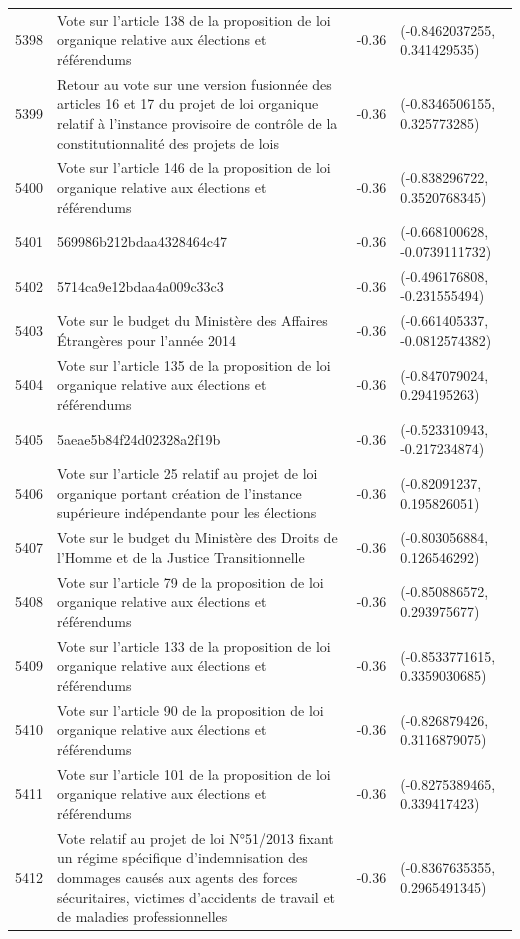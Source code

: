 \begin{table}[ht]
\begin{tabular}{rlrl}
  5398 & Vote sur l'article 138 de la proposition de loi organique relative aux élections et référendums & -0.36 & (-0.8462037255, 0.341429535) \\ 
  5399 & Retour au vote sur une version fusionnée des articles 16 et 17 du projet de loi organique relatif à l'instance provisoire de contrôle de la constitutionnalité des projets de lois & -0.36 & (-0.8346506155, 0.325773285) \\ 
  5400 & Vote sur l'article 146 de la proposition de loi organique relative aux élections et référendums & -0.36 & (-0.838296722, 0.3520768345) \\ 
  5401 & 569986b212bdaa4328464c47 & -0.36 & (-0.668100628, -0.0739111732) \\ 
  5402 & 5714ca9e12bdaa4a009c33c3 & -0.36 & (-0.496176808, -0.231555494) \\ 
  5403 & Vote sur le budget du Ministère des Affaires Étrangères pour l'année 2014 & -0.36 & (-0.661405337, -0.0812574382) \\ 
  5404 & Vote sur l'article 135 de la proposition de loi organique relative aux élections et référendums & -0.36 & (-0.847079024, 0.294195263) \\ 
  5405 & 5aeae5b84f24d02328a2f19b & -0.36 & (-0.523310943, -0.217234874) \\ 
  5406 & Vote sur l'article 25 relatif au projet de loi organique portant création de l'instance supérieure indépendante pour les élections & -0.36 & (-0.82091237, 0.195826051) \\ 
  5407 & Vote sur le budget du Ministère des Droits de l'Homme et de la Justice Transitionnelle & -0.36 & (-0.803056884, 0.126546292) \\ 
  5408 & Vote sur l'article 79 de la proposition de loi organique relative aux élections et référendums & -0.36 & (-0.850886572, 0.293975677) \\ 
  5409 & Vote sur l'article 133 de la proposition de loi organique relative aux élections et référendums & -0.36 & (-0.8533771615, 0.3359030685) \\ 
  5410 & Vote sur l'article 90 de la proposition de loi organique relative aux élections et référendums & -0.36 & (-0.826879426, 0.3116879075) \\ 
  5411 & Vote sur l'article 101 de la proposition de loi organique relative aux élections et référendums & -0.36 & (-0.8275389465, 0.339417423) \\ 
  5412 & Vote relatif au projet de loi N°51/2013 fixant un régime spécifique d'indemnisation des dommages causés aux agents des forces sécuritaires, victimes d'accidents de travail et de maladies professionnelles & -0.36 & (-0.8367635355, 0.2965491345) \\ 

\end{tabular}
\end{table}
